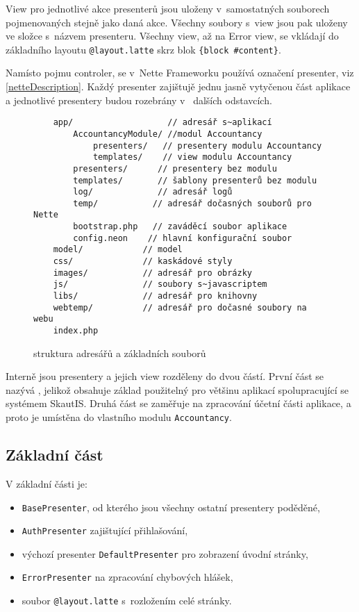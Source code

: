 \documentclass[thesis=B,czech]{FITthesis}[2012/04/27]
\begin{document}
View pro jednotlivé akce presenterů jsou uloženy v~samostatných souborech pojmenovaných stejně jako daná akce. Všechny soubory s~view jsou pak uloženy ve složce s~názvem presenteru. Všechny view, až na Error view, se vkládají do základního layoutu \texttt{@layout.latte} skrz blok \texttt{\{block \#content\}}. 

Namísto pojmu controler, se v~Nette Frameworku používá označení presenter, viz \ref{netteDescription}. Každý presenter zajištujě jednu jasně vytyčenou část aplikace a jednotlivé presentery budou rozebrány v ~dalších odstavcích.

\begin{figure}[h]\centering
\begin{verbatim}
    app/                   // adresář s~aplikací
        AccountancyModule/ //modul Accountancy
            presenters/   // presentery modulu Accountancy
            templates/    // view modulu Accountancy
        presenters/      // presentery bez modulu
        templates/       // šablony presenterů bez modulu
        log/             // adresář logů
        temp/           // adresář dočasných souborů pro Nette
        bootstrap.php   // zaváděcí soubor aplikace
        config.neon    // hlavní konfigurační soubor
    model/            // model
    css/              // kaskádové styly
    images/           // adresář pro obrázky
    js/               // soubory s~javascriptem
    libs/             // adresář pro knihovny
    webtemp/          // adresář pro dočasné soubory na webu
    index.php
\end{verbatim}
\caption{struktura adresářů a základních souborů}\label{directoryStructure}
\end{figure}

Interně jsou presentery a jejich view rozděleny do dvou částí. První část se nazývá , jelikož obsahuje základ použitelný pro většinu aplikací spolupracující se systémem SkautIS. Druhá část se zaměřuje na zpracování účetní části aplikace, a proto je umístěna do vlastního modulu \texttt{Accountancy}.

\subsection{Základní část}
V základní části je:
\begin{itemize}
	\item \texttt{BasePresenter}, od kterého jsou všechny ostatní presentery poděděné,
	\item \texttt{AuthPresenter} zajištující přihlašování,
	\item výchozí presenter \texttt{DefaultPresenter} pro zobrazení úvodní stránky,
	\item \texttt{ErrorPresenter} na zpracování chybových hlášek,
	\item soubor \texttt{@layout.latte} s~rozložením celé stránky.
\end{itemize}
\end{document}
